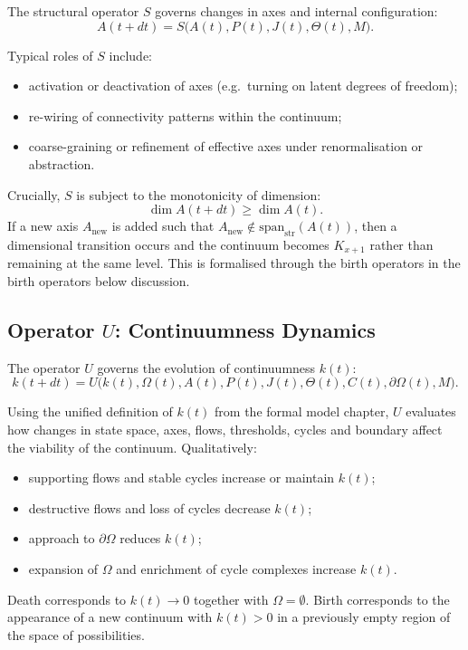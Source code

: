 The structural operator \(S\) governs changes in axes and internal
configuration:
\[
  A(t+dt) = S\big(A(t), P(t), J(t), \Theta(t), M\big).
\]

Typical roles of \(S\) include:
\begin{itemize}
  \item activation or deactivation of axes (e.g.\ turning on latent degrees of
        freedom);
  \item re-wiring of connectivity patterns within the continuum;
  \item coarse-graining or refinement of effective axes under renormalisation
        or abstraction.
\end{itemize}

Crucially, \(S\) is subject to the monotonicity of dimension:
\[
  \dim A(t+dt) \ge \dim A(t).
\]
If a new axis \(A_{\mathrm{new}}\) is added such that
\(A_{\mathrm{new}} \notin \mathrm{span}_{\mathrm{str}}(A(t))\), then a dimensional transition
occurs and the continuum becomes \(K_{x+1}\) rather than remaining at the same
level. This is formalised through the birth operators in
the birth operators below discussion.

\subsection{Operator \texorpdfstring{\texorpdfstring{$U$}{U}}{U}: Continuumness Dynamics}

The operator \(U\) governs the evolution of continuumness \(k(t)\):
\[
  k(t+dt) =
  U\big(k(t), \Omega(t), A(t), P(t), J(t),
        \Theta(t), C(t), \partial\Omega(t), M\big).
\]

Using the unified definition of \(k(t)\) from the formal model chapter, \(U\)
evaluates how changes in state space, axes, flows, thresholds, cycles and
boundary affect the viability of the continuum. Qualitatively:
\begin{itemize}
  \item supporting flows and stable cycles increase or maintain \(k(t)\);
  \item destructive flows and loss of cycles decrease \(k(t)\);
  \item approach to \(\partial\Omega\) reduces \(k(t)\);
  \item expansion of \(\Omega\) and enrichment of cycle complexes increase
        \(k(t)\).
\end{itemize}

Death corresponds to \(k(t) \to 0\) together with \(\Omega = \emptyset\).
Birth corresponds to the appearance of a new continuum with
\(k(t) > 0\) in a previously empty region of the space of possibilities.

